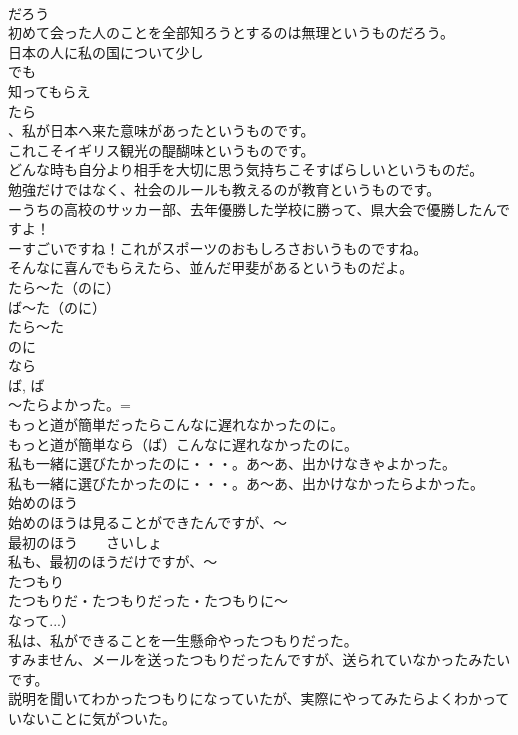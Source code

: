 \documentclass[8pt]{extreport}
\begin{document}
\begin{CJK}{UTF8}{min}
\\	だろう 
\\	初めて会った人のことを全部知ろうとするのは無理というものだろう。
\\	日本の人に私の国について少し
\\	でも
\\	知ってもらえ
\\	たら
\\	、私が日本へ来た意味があったというものです。
\\	これこそイギリス観光の醍醐味というものです。
\\	どんな時も自分より相手を大切に思う気持ちこそすばらしいというものだ。
\\	勉強だけではなく、社会のルールも教えるのが教育というものです。
\\	ーうちの高校のサッカー部、去年優勝した学校に勝って、県大会で優勝したんですよ！
\\	ーすごいですね！これがスポーツのおもしろさおいうものですね。
\\	そんなに喜んでもらえたら、並んだ甲斐があるというものだよ。
\\	たら～た（のに）
\\	ば～た（のに）
\\	たら～た
\\	のに 
\\	なら
\\	ば, ば 
\\	～たらよかった。= 
\\	もっと道が簡単だったらこんなに遅れなかったのに。
\\	もっと道が簡単なら（ば）こんなに遅れなかったのに。
\\	私も一緒に選びたかったのに・・・。あ～あ、出かけなきゃよかった。
\\	私も一緒に選びたかったのに・・・。あ～あ、出かけなかったらよかった。
\\	始めのほう
\\	始めのほうは見ることができたんですが、～
\\	最初のほう　　さいしょ
\\	私も、最初のほうだけですが、～
\\	たつもり
\\	たつもりだ・たつもりだった・たつもりに～
\\	なって...）
\\	私は、私ができることを一生懸命やったつもりだった。
\\	すみません、メールを送ったつもりだったんですが、送られていなかったみたいです。
\\	説明を聞いてわかったつもりになっていたが、実際にやってみたらよくわかっていないことに気がついた。

\end{CJK}
\end{document}
